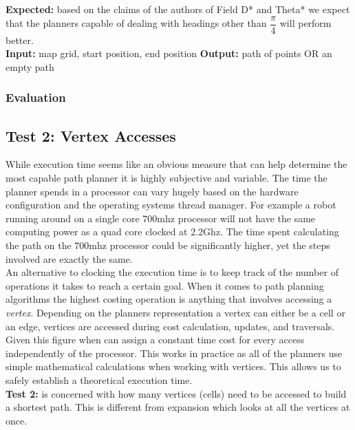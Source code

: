 \noindent
\textbf{Expected:} based on the claims of the authors of Field D* and Theta* we expect that the planners capable of dealing with headings other than $\dfrac{\pi}{4}$ will perform better.\\

\noindent
\textbf{Input:} map grid, start position, end position
\textbf{Output:} path of points OR an empty path

\subsubsection{Evaluation}

\newpage

\subsection{Test 2: Vertex Accesses}

\noindent
While execution time seems like an obvious measure that can help determine the most capable path planner it is highly subjective and variable. The time the planner spends in a processor can vary hugely based on the hardware configuration and the operating systems thread manager. For example a robot running around on a single core 700mhz processor will not have the same computing power as a quad core clocked at 2.2Ghz. The time spent calculating the path on the 700mhz processor could be significantly higher, yet the steps involved are exactly the same. \\

\noindent
An alternative to clocking the execution time is to keep track of the number of operations it takes to reach a certain goal. When it comes to path planning algorithms the highest costing operation is anything that involves accessing a \textit{vertex}. Depending on the planners representation a vertex can either be a cell or an edge, vertices are accessed during cost calculation, updates, and traversals. Given this figure when can assign a constant time cost for every access independently of the processor. This works in practice as all of the planners use simple mathematical calculations when working with vertices. This allows us to safely establish a theoretical execution time. \\   

\noindent
\textbf{Test 2:} is concerned with how many vertices (cells) need to be accessed to build a shortest path. This is different from expansion which looks at all the vertices at once.\\

